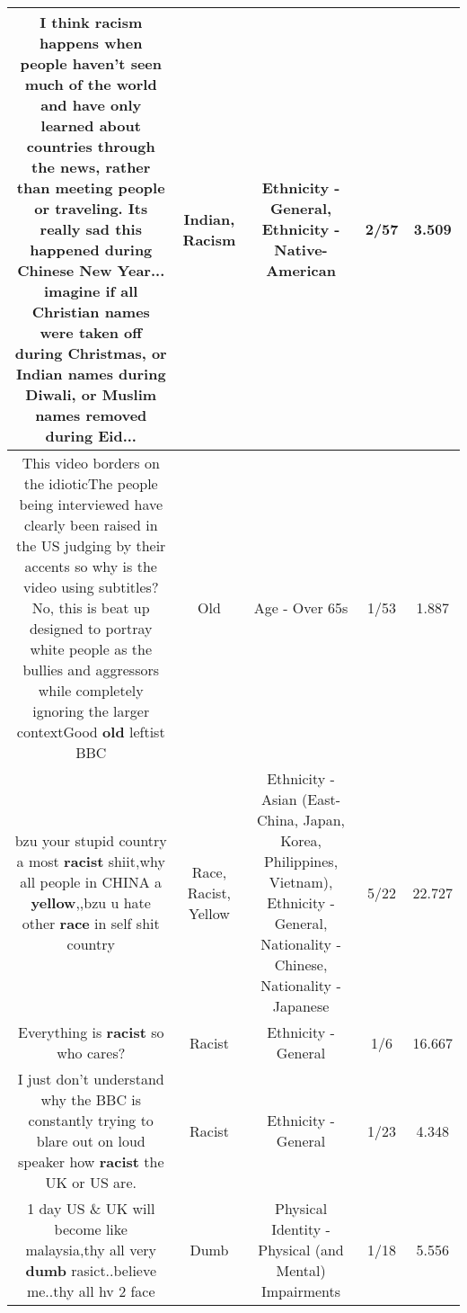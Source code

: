 \documentclass[11pt]{article}
\newlength\mylength
\begin{document}
\begin{center}
\begin{longtable}{|C{.65\mylength}|C{.30\mylength}|C{.12\mylength}|C{.12\mylength}|C{.12\mylength}|}
  \small I think \textbf{racism} happens when people haven't seen much of the world and have only learned about countries through the news, rather than meeting people or traveling. Its really sad this happened during Chinese New Year... imagine if all Christian names were taken off during Christmas, or \textbf{Indian} names during Diwali, or Muslim names removed during Eid...\normalsize   & Indian, Racism & Ethnicity - General, Ethnicity - Native-American & 2/57 & 3.509 \\  \hline
  \small This video borders on the idioticThe people being interviewed have clearly been raised in the US judging by their accents so why is the video using subtitles?No, this is beat up designed to portray white people as the bullies and aggressors while completely ignoring the larger contextGood \textbf{old} leftist BBC\normalsize   & Old & Age - Over 65s & 1/53 & 1.887 \\  \hline
  \small bzu your stupid country a most \textbf{racist} shiit,why all people in CHINA a \textbf{y\textbf{e\textbf{llow}}},,bzu u hate other \textbf{race} in self shit country\normalsize   & Race, Racist, Yellow & Ethnicity - Asian (East- China, Japan, Korea, Philippines, Vietnam), Ethnicity - General, Nationality - Chinese, Nationality - Japanese & 5/22 & 22.727 \\  \hline
  \small Everything is \textbf{racist} so who cares?\normalsize   & Racist & Ethnicity - General & 1/6 & 16.667 \\  \hline
  \small I just don't understand why the BBC is constantly trying to blare out on loud speaker how \textbf{racist} the UK or US are.\normalsize   & Racist & Ethnicity - General & 1/23 & 4.348 \\  \hline
  \small 1 day US \& UK will become like malaysia,thy all very \textbf{dumb} rasict..believe me..thy all hv 2 face\normalsize   & Dumb & Physical Identity - Physical (and Mental) Impairments & 1/18 & 5.556 \\  \hline

\end{longtable}
\end{center}
\end{document}
